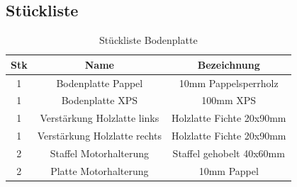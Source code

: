 \subsection{Stückliste}
\begin{table}[H]
    \centering
    \begin{tabular}{|c|c|c|}
        \hline
        \textbf{Stk} & \textbf{Name} & \textbf{Bezeichnung}\\\hline
        1 & Bodenplatte Pappel & 10mm Pappelsperrholz\\\hline
        1 & Bodenplatte XPS & 100mm XPS\\\hline
        1 & Verstärkung Holzlatte links & Holzlatte Fichte 20x90mm\\\hline
        1 & Verstärkung Holzlatte rechts & Holzlatte Fichte 20x90mm\\\hline
        2 & Staffel Motorhalterung & Staffel gehobelt 40x60mm\\\hline
        2 & Platte Motorhalterung & 10mm Pappel\\\hline
    \end{tabular}
    \caption{Stückliste Bodenplatte}
    \label{tab:konst:bodenplatte:stueckliste}
\end{table}

